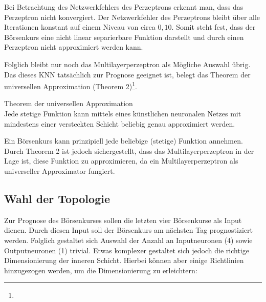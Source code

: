Bei Betrachtung des Netzwerkfehlers des Perzeptrons erkennt man, dass das Perzeptron nicht konvergiert. Der Netzwerkfehler des Perzeptrons bleibt über alle Iterationen konstant auf einem Niveau von circa $0,10$. Somit steht fest, dass der Börsenkurs eine nicht linear separierbare Funktion darstellt und durch einen Perzeptron nicht approximiert werden kann.

Folglich bleibt nur noch das Multilayerperzeptron als Mögliche Auswahl übrig. Das dieses KNN tatsächlich zur Prognose geeignet ist, belegt das Theorem der universellen Approximation (Theorem 2)\footnote{\Vgl{}}.

\begin{theo}Theorem der universellen Approximation\\
Jede stetige Funktion kann mittels eines künstlichen neuronalen Netzes mit mindestens einer versteckten Schicht beliebig genau approximiert werden.
\end{theo}

Ein Börsenkurs kann prinzipiell jede beliebige (stetige) Funktion annehmen. Durch Theorem 2 ist jedoch sichergestellt, dass das Multilayerperzeptron in der Lage ist, diese Funktion zu approximieren, da ein Multilayerperzeptron als universeller Approximator fungiert.

\subsection{Wahl der Topologie}
\label{subsection:Wahl der Topologie}

Zur Prognose des Börsenkurses sollen die letzten vier Börsenkurse als Input dienen. Durch diesen Input soll der Börsenkurs am nächsten Tag prognostiziert werden. Folglich gestaltet sich Auswahl der Anzahl an Inputneuronen (4) sowie Outputneuronen (1) trivial.
Etwas komplexer gestaltet sich jedoch die richtige Dimensionierung der inneren Schicht. Hierbei können aber einige Richtlinien hinzugezogen werden, um die Dimensionierung zu erleichtern:

